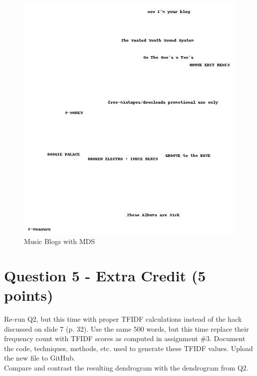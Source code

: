 \documentclass{article}
\begin{document}
\begin{figure}[H]
\centering
\includegraphics[scale=0.50]{q04/musicMDS}
\caption{Music Blogs with MDS}
\label{musicMDS}
\end{figure}


\newpage
\section*{Question 5 - Extra Credit (5 points)}
Re-run Q2, but this time with proper TFIDF calculations instead of the hack discussed on slide 7 (p. 32). Use the same 500 words, but this time replace their frequency count with TFIDF scores as computed in assignment \#3. Document the code, techniques, methods, etc. used to generate these TFIDF values. Upload the new file to GitHub. \\

Compare and contrast the resulting dendrogram with the dendrogram from Q2. \\
\end{document}
